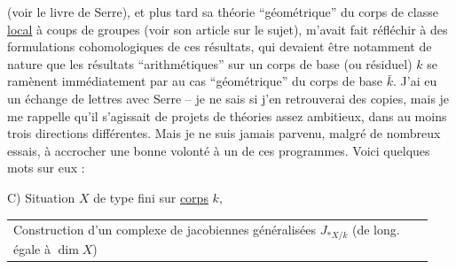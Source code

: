   (voir le livre de Serre), et plus tard sa théorie ``géométrique'' du corps de classe \uline{local} à coups de groupes  (voir son article sur le sujet), m'avait fait réfléchir à des formulations cohomologiques de ces résultats, qui devaient être notamment de nature  que les résultats ``arithmétiques'' sur un corps de base (ou résiduel) $k$  se ramènent immédiatement par  au cas ``géométrique'' du corps de base $\bar{k}$. J'ai eu un échange de lettres avec Serre -- je ne sais si j'en retrouverai des copies, mais je me rappelle qu'il s'agissait de projets de théories assez ambitieux,  dans au moins trois directions différentes. Mais je ne suis jamais parvenu, malgré de nombreux essais, à accrocher une bonne volonté à un de ces programmes. Voici quelques mots sur eux :

C) Situation $X$ de type fini sur \uline{corps} $k$,

\noindent\begin{tabular}{@{}|p{0.94\linewidth}@{}}
Construction d'un complexe de jacobiennes généralisées $J_{*X/k}$ (de long. égale à $\dim X$)
\end{tabular}

